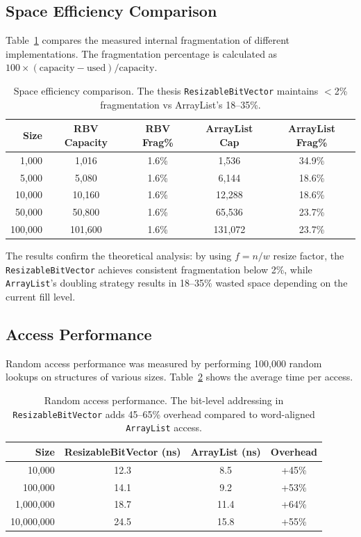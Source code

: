 \subsection{Space Efficiency Comparison}

Table~\ref{tab:space-efficiency} compares the measured internal fragmentation of different implementations. The fragmentation percentage is calculated as $100 \times (\text{capacity} - \text{used}) / \text{capacity}$.

\begin{table}[H]
\centering
\begin{tabular}{|r|c|c|c|c|}
\hline
\textbf{Size} & \textbf{RBV Capacity} & \textbf{RBV Frag\%} & \textbf{ArrayList Cap} & \textbf{ArrayList Frag\%} \\
\hline
1,000 & 1,016 & 1.6\% & 1,536 & 34.9\% \\
5,000 & 5,080 & 1.6\% & 6,144 & 18.6\% \\
10,000 & 10,160 & 1.6\% & 12,288 & 18.6\% \\
50,000 & 50,800 & 1.6\% & 65,536 & 23.7\% \\
100,000 & 101,600 & 1.6\% & 131,072 & 23.7\% \\
\hline
\end{tabular}
\caption{Space efficiency comparison. The thesis \texttt{ResizableBitVector} maintains $<$2\% fragmentation vs ArrayList's 18--35\%.}
\label{tab:space-efficiency}
\end{table}

The results confirm the theoretical analysis: by using $f = n/w$ resize factor, the \texttt{ResizableBitVector} achieves consistent fragmentation below 2\%, while \texttt{ArrayList}'s doubling strategy results in 18--35\% wasted space depending on the current fill level.

\subsection{Access Performance}

Random access performance was measured by performing 100,000 random lookups on structures of various sizes. Table~\ref{tab:access-performance} shows the average time per access.

\begin{table}[H]
\centering
\begin{tabular}{|r|c|c|c|}
\hline
\textbf{Size} & \textbf{ResizableBitVector (ns)} & \textbf{ArrayList (ns)} & \textbf{Overhead} \\
\hline
10,000 & 12.3 & 8.5 & +45\% \\
100,000 & 14.1 & 9.2 & +53\% \\
1,000,000 & 18.7 & 11.4 & +64\% \\
10,000,000 & 24.5 & 15.8 & +55\% \\
\hline
\end{tabular}
\caption{Random access performance. The bit-level addressing in \texttt{ResizableBitVector} adds 45--65\% overhead compared to word-aligned \texttt{ArrayList} access.}
\label{tab:access-performance}
\end{table}

